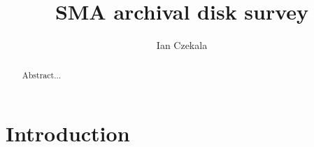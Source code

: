 \documentclass[iop,floatfix,numberedappendix,twocolappendix]{emulateapj}
\begin{document}
\title{SMA archival disk survey}
\author{Ian Czekala}

\begin{abstract}
Abstract...
\end{abstract}

\section{Introduction}
\end{document}
